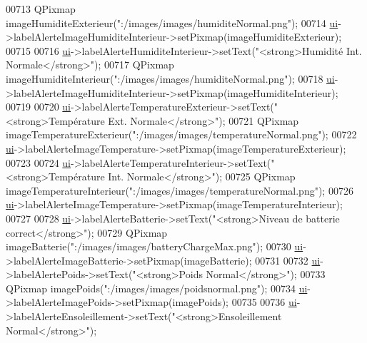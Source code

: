 \begin{DoxyCode}
00713     QPixmap imageHumiditeExterieur(\textcolor{stringliteral}{":/images/images/humiditeNormal.png"});
00714     \hyperlink{class_ruche_ihm_a64786058bd7f88ca2f1e9743bb27c25b}{ui}->labelAlerteImageHumiditeInterieur->setPixmap(imageHumiditeExterieur);
00715 
00716     \hyperlink{class_ruche_ihm_a64786058bd7f88ca2f1e9743bb27c25b}{ui}->labelAlerteHumiditeInterieur->setText(\textcolor{stringliteral}{"<strong>Humidité Int. Normale</strong>"});
00717     QPixmap imageHumiditeInterieur(\textcolor{stringliteral}{":/images/images/humiditeNormal.png"});
00718     \hyperlink{class_ruche_ihm_a64786058bd7f88ca2f1e9743bb27c25b}{ui}->labelAlerteImageHumiditeInterieur->setPixmap(imageHumiditeInterieur);
00719 
00720     \hyperlink{class_ruche_ihm_a64786058bd7f88ca2f1e9743bb27c25b}{ui}->labelAlerteTemperatureExterieur->setText(\textcolor{stringliteral}{"<strong>Température Ext. Normale</strong>"});
00721     QPixmap imageTemperatureExterieur(\textcolor{stringliteral}{":/images/images/temperatureNormal.png"});
00722     \hyperlink{class_ruche_ihm_a64786058bd7f88ca2f1e9743bb27c25b}{ui}->labelAlerteImageTemperature->setPixmap(imageTemperatureExterieur);
00723 
00724     \hyperlink{class_ruche_ihm_a64786058bd7f88ca2f1e9743bb27c25b}{ui}->labelAlerteTemperatureInterieur->setText(\textcolor{stringliteral}{"<strong>Température Int. Normale</strong>"});
00725     QPixmap imageTemperatureInterieur(\textcolor{stringliteral}{":/images/images/temperatureNormal.png"});
00726     \hyperlink{class_ruche_ihm_a64786058bd7f88ca2f1e9743bb27c25b}{ui}->labelAlerteImageTemperature->setPixmap(imageTemperatureInterieur);
00727 
00728     \hyperlink{class_ruche_ihm_a64786058bd7f88ca2f1e9743bb27c25b}{ui}->labelAlerteBatterie->setText(\textcolor{stringliteral}{"<strong>Niveau de batterie correct</strong>"});
00729     QPixmap imageBatterie(\textcolor{stringliteral}{":/images/images/batteryChargeMax.png"});
00730     \hyperlink{class_ruche_ihm_a64786058bd7f88ca2f1e9743bb27c25b}{ui}->labelAlerteImageBatterie->setPixmap(imageBatterie);
00731 
00732     \hyperlink{class_ruche_ihm_a64786058bd7f88ca2f1e9743bb27c25b}{ui}->labelAlertePoids->setText(\textcolor{stringliteral}{"<strong>Poids Normal</strong>"});
00733     QPixmap imagePoids(\textcolor{stringliteral}{":/images/images/poidsnormal.png"});
00734     \hyperlink{class_ruche_ihm_a64786058bd7f88ca2f1e9743bb27c25b}{ui}->labelAlerteImagePoids->setPixmap(imagePoids);
00735 
00736     \hyperlink{class_ruche_ihm_a64786058bd7f88ca2f1e9743bb27c25b}{ui}->labelAlerteEnsoleillement->setText(\textcolor{stringliteral}{"<strong>Ensoleillement Normal</strong>"});

\end{DoxyCode}
